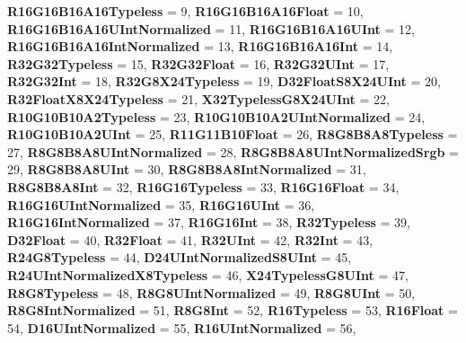 \begin{DoxyCompactItemize}
\newline
{\bfseries R16\+G16\+B16\+A16\+Typeless} = 9, 
{\bfseries R16\+G16\+B16\+A16\+Float} = 10, 
{\bfseries R16\+G16\+B16\+A16\+U\+Int\+Normalized} = 11, 
{\bfseries R16\+G16\+B16\+A16\+U\+Int} = 12, 
\newline
{\bfseries R16\+G16\+B16\+A16\+Int\+Normalized} = 13, 
{\bfseries R16\+G16\+B16\+A16\+Int} = 14, 
{\bfseries R32\+G32\+Typeless} = 15, 
{\bfseries R32\+G32\+Float} = 16, 
\newline
{\bfseries R32\+G32\+U\+Int} = 17, 
{\bfseries R32\+G32\+Int} = 18, 
{\bfseries R32\+G8\+X24\+Typeless} = 19, 
{\bfseries D32\+Float\+S8\+X24\+U\+Int} = 20, 
\newline
{\bfseries R32\+Float\+X8\+X24\+Typeless} = 21, 
{\bfseries X32\+Typeless\+G8\+X24\+U\+Int} = 22, 
{\bfseries R10\+G10\+B10\+A2\+Typeless} = 23, 
{\bfseries R10\+G10\+B10\+A2\+U\+Int\+Normalized} = 24, 
\newline
{\bfseries R10\+G10\+B10\+A2\+U\+Int} = 25, 
{\bfseries R11\+G11\+B10\+Float} = 26, 
{\bfseries R8\+G8\+B8\+A8\+Typeless} = 27, 
{\bfseries R8\+G8\+B8\+A8\+U\+Int\+Normalized} = 28, 
\newline
{\bfseries R8\+G8\+B8\+A8\+U\+Int\+Normalized\+Srgb} = 29, 
{\bfseries R8\+G8\+B8\+A8\+U\+Int} = 30, 
{\bfseries R8\+G8\+B8\+A8\+Int\+Normalized} = 31, 
{\bfseries R8\+G8\+B8\+A8\+Int} = 32, 
\newline
{\bfseries R16\+G16\+Typeless} = 33, 
{\bfseries R16\+G16\+Float} = 34, 
{\bfseries R16\+G16\+U\+Int\+Normalized} = 35, 
{\bfseries R16\+G16\+U\+Int} = 36, 
\newline
{\bfseries R16\+G16\+Int\+Normalized} = 37, 
{\bfseries R16\+G16\+Int} = 38, 
{\bfseries R32\+Typeless} = 39, 
{\bfseries D32\+Float} = 40, 
\newline
{\bfseries R32\+Float} = 41, 
{\bfseries R32\+U\+Int} = 42, 
{\bfseries R32\+Int} = 43, 
{\bfseries R24\+G8\+Typeless} = 44, 
\newline
{\bfseries D24\+U\+Int\+Normalized\+S8\+U\+Int} = 45, 
{\bfseries R24\+U\+Int\+Normalized\+X8\+Typeless} = 46, 
{\bfseries X24\+Typeless\+G8\+U\+Int} = 47, 
{\bfseries R8\+G8\+Typeless} = 48, 
\newline
{\bfseries R8\+G8\+U\+Int\+Normalized} = 49, 
{\bfseries R8\+G8\+U\+Int} = 50, 
{\bfseries R8\+G8\+Int\+Normalized} = 51, 
{\bfseries R8\+G8\+Int} = 52, 
\newline
{\bfseries R16\+Typeless} = 53, 
{\bfseries R16\+Float} = 54, 
{\bfseries D16\+U\+Int\+Normalized} = 55, 
{\bfseries R16\+U\+Int\+Normalized} = 56, 

\end{DoxyCompactItemize}
